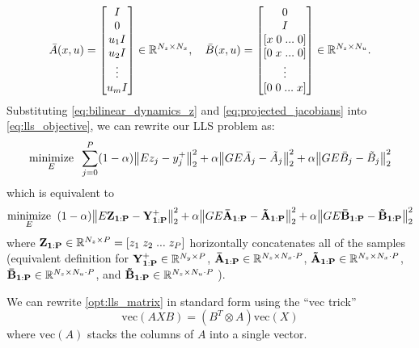 \documentclass{article}
\begin{document}
  \begin{equation}
      \bar{A}(x,u) =  \begin{bmatrix} 
          I \\ 0 \\ u_1 I \\ u_2 I \\ \vdots \\ u_m I 
      \end{bmatrix} \in \mathbb{R}^{N_z \times N_x}, \quad
      \bar{B}(x,u) = \begin{bmatrix} 
          0 \\ 
          I \\ 
          [x \; 0 \; ... \; 0] \\
          [0 \; x \; ... \; 0] \\
          \vdots \\
          [0 \; 0 \; ... \; x] \\
      \end{bmatrix} \in \mathbb{R}^{N_z \times N_u}.
  \end{equation}
  Substituting \eqref{eq:bilinear_dynamics_z} and \eqref{eq:projected_jacobians} into
  \eqref{eq:lls_objective}, we can rewrite our LLS problem as:
  \begin{align}
      \underset{E}{\text{minimize}} \;\; 
          \sum_{j=0}^P
          (1-\alpha) \norm{E z_j - y_j^+}_2^2 + 
            \alpha  \norm{G E \bar{A}_j - \tilde{A}_j}_2^2 + 
            \alpha  \norm{G E \bar{B}_j - \tilde{B}_j}_2^2 
  \end{align}
  which is equivalent to
  \begin{align} \label{opt:lls_matrix}
      \underset{E}{\text{minimize}} \;\; 
          (1-\alpha) \norm{E \mathbf{Z_{1:P}} - \mathbf{Y^+_{1:P}} }_2^2 + 
            \alpha  \norm{G E \mathbf{\bar{A}_{1:P}} - \mathbf{\tilde{A}_{1:P}}}_2^2 + 
            \alpha  \norm{G E \mathbf{\bar{B}_{1:P}} - \mathbf{\tilde{B}_{1:P}}}_2^2
  \end{align}
  where $\mathbf{Z_{1:P}} \in \mathbb{R}^{N_z \times P} = [z_1 \; z_2 \; ... \; z_P]$ horizontally
  concatenates all of the samples (equivalent definition for 
  $\mathbf{Y^+_{1:P}} \in \mathbb{R}^{N_y \times P}$, 
  $\mathbf{\bar{A}_{1:P}} \in \mathbb{R}^{N_z \times N_x \cdot P}$, 
  $\mathbf{\tilde{A}_{1:P}} \in \mathbb{R}^{N_z \times N_x \cdot P}$,
  $\mathbf{\bar{B}_{1:P}} \in \mathbb{R}^{N_z \times N_u \cdot P}$, and 
  $\mathbf{\tilde{B}_{1:P}} \in \mathbb{R}^{N_z \times N_u \cdot P}$ ).

  We can rewrite \eqref{opt:lls_matrix} in standard form using the ``vec trick''
  \begin{equation} \label{eq:vectrick}
      \text{vec}(A X B) = (B^T \otimes A) \text{vec}(X)
  \end{equation}
  where $\text{vec}(A)$ stacks the columns of $A$ into a single vector.
\end{document}

